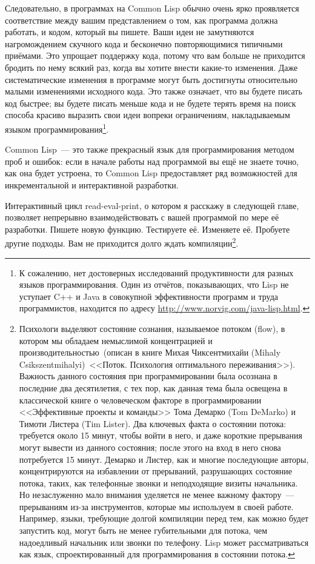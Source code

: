 Следовательно, в программах на Common Lisp обычно очень ярко проявляется соответствие
между вашим представлением о том, как программа должна работать, и кодом, который вы
пишете. Ваши идеи не замутняются нагромождением скучного кода и бесконечно повторяющимися
типичными приёмами. Это упрощает поддержку кода, потому что вам больше не приходится
бродить по нему всякий раз, когда вы хотите внести какие-то изменения. Даже
систематические изменения в программе могут быть достигнуты относительно малыми
изменениями исходного кода. Это также означает, что вы будете писать код быстрее; вы
будете писать меньше кода и не будете терять время на поиск способа красиво выразить свои идеи
вопреки ограничениям, накладываемым языком программирования\footnote{К сожалению, нет
  достоверных исследований продуктивности для разных языков программирования. Один из
  отчётов, показывающих, что Lisp не уступает C++ и Java в совокупной эффективности
  программ и труда программистов, находится по адресу
  \url{http://www.norvig.com/java-lisp.html}.}.

Common Lisp~--- это также прекрасный язык для программирования методом проб и ошибок:
если в начале работы над программой вы ещё не знаете точно, как она будет устроена, то
Common Lisp предоставляет ряд возможностей для инкрементальной и интерактивной разработки.

Интерактивный цикл read-eval-print, о котором я расскажу в следующей главе, позволяет
непрерывно взаимодействовать с вашей программой по мере её разработки. Пишете новую
функцию. Тестируете её. Изменяете её. Пробуете другие подходы. Вам не
приходится долго ждать компиляции\footnote{Психологи выделяют состояние
  сознания, называемое потоком (flow), в котором мы обладаем немыслимой концентрацией и
  производительностью~(описан в книге Михая Чиксентмихайи (Mihaly Csikszentmihalyi)~<<Поток.
  Психология оптимального переживания>>). Важность данного состояния при программировании
  была осознана в последние два десятилетия, с тех пор, как данная тема была освещена в
  классической книге о человеческом факторе в программировании <<Эффективные проекты и
  команды>> Тома Демарко (Tom DeMarko) и Тимоти Листера (Tim Lister). Два ключевых факта о
  состоянии потока: требуется около 15 минут, чтобы войти в него, и даже короткие
  прерывания могут вывести из данного состояния; после этого на вход в него снова потребуется
  15 минут. Демарко и Листер, как и многие последующие авторы, концентрируются на
  избавлении от прерываний, разрушающих состояние потока, таких, как телефонные звонки и
  неподходящие визиты начальника. Но незаслуженно мало внимания уделяется не менее важному фактору~---
  прерываниям из-за инструментов, которые мы используем в своей работе. Например, языки,
  требующие долгой компиляции перед тем, как можно будет запустить код, могут быть
  не менее губительными для потока, чем надоедливый начальник или звонки по телефону. Lisp
  может рассматриваться как язык, спроектированный для программирования в состоянии потока.}.

